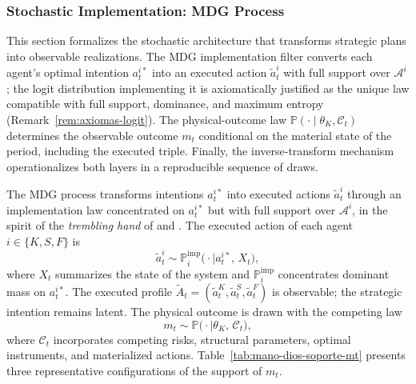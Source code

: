 \documentclass[12pt,a4paper]{article}
\providecommand{\textcite}{\citet}
\theoremstyle{plain}
\theoremstyle{definition}
\theoremstyle{remark}
\newcommand{\ProbE}{\mathbb{P}}
\newcommand{\ProbI}[1]{\mathbb{P}_{#1}^{\mathrm{imp}}}
\newcommand{\1}{\mathbf{1}}
\begin{document}
\subsubsection{Stochastic Implementation: MDG Process}
\label{subsec:discrete}
\label{sec:estructura-juego}
\label{sec:mano-de-dios}

This section formalizes the stochastic architecture that transforms strategic plans
into observable realizations. The MDG implementation filter converts each agent's
optimal intention $a_t^{i\ast}$ into an executed action $\tilde a_t^i$ with full support
over $\mathcal{A}^i$; the logit distribution implementing it is axiomatically justified
as the unique law compatible with full support, dominance, and maximum entropy
\textup{(}Remark~\ref{rem:axiomas-logit}\textup{)}. The physical-outcome law
$\ProbE(\cdot\mid\theta_K,\mathcal C_t)$ determines the observable outcome $m_t$
conditional on the material state of the period, including the executed triple.
Finally, the inverse-transform mechanism operationalizes both layers in a reproducible
sequence of draws.

The MDG process transforms intentions $a_t^{i\ast}$ into executed actions
$\tilde a_t^i$ through an implementation law concentrated on $a_t^{i\ast}$ but with
full support over $\mathcal{A}^i$, in the spirit of the \textit{trembling hand} of
\textcite{Selten1975Perfectness} and \textcite{KrepsWilson1982}. The executed action of
each agent $i\in\{K,S,F\}$ is
\begin{equation}
\label{eq:mano-dios-jugador}
\tilde{a}_t^i \sim \ProbI{i}\bigl(\cdot \mid a_t^{i\ast},\, X_t\bigr),
\end{equation}
where $X_t$ summarizes the state of the system and $\ProbI{i}$ concentrates dominant
mass on $a_t^{i\ast}$. The executed profile
$\tilde{A}_t=(\tilde a_t^K,\tilde a_t^S,\tilde a_t^F)$ is observable; the strategic
intention remains latent. The physical outcome is drawn with the competing law
\begin{equation}
\label{eq:m-given-tilde-A}
m_t \sim \ProbE\bigl(\cdot \mid \theta_K,\,\mathcal C_t\bigr),
\end{equation}
where $\mathcal C_t$ incorporates competing risks, structural parameters, optimal
instruments, and materialized actions. Table~\ref{tab:mano-dios-soporte-mt} presents
three representative configurations of the support of $m_t$.
\end{document}
